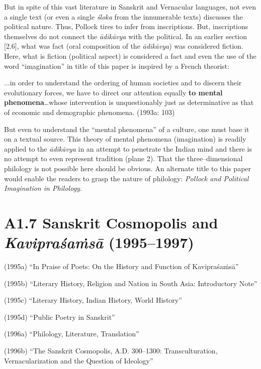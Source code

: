 {{But in spite of this vast literature in Sanskrit and Vernacular languages, not even a single text (or even a single \textit{śloka} from the innumerable texts) discusses the political nature. Thus, Pollock tires to infer from inscriptions. But, inscriptions themselves do not connect the \textit{ādikāvya} with the political. In an earlier section [2.6], what was fact (oral composition of the\textit{ ādikāvya}) was considered fiction. Here, what is fiction (political aspect) is considered a fact and even the use of the word “imagination” in title of this paper is inspired by a French theorist:

\begin{myquote}
...in order to understand the ordering of human societies and to discern their evolutionary forces, we have to direct our attention equally \textbf{to mental phenomena}…whose intervention is unquestionably just as determinative as that of economic and demographic phenomena. (1993a: 103)
\end{myquote}

But even to understand the “mental phenomena” of a culture, one must base it on a textual source. This theory of mental phenomena (imagination) is readily applied to the \textit{ādikāvya} in an attempt to penetrate the Indian mind and there is no attempt to even represent tradition (plane 2). That the three–dimensional philology is not possible here should be obvious. An alternate title to this paper would enable the readers to grasp the nature of philology: \textit{Pollock and Political Imagination in Philology}.

\vspace{-.3cm}

\section*{A1.7 Sanskrit Cosmopolis and \textit{Kavipraśaṁsā} (1995–1997)}

(1995a) “In Praise of Poets: On the History and Function of Kavipraśaṁsā”

(1995b) “Literary History, Religion and Nation in South Asia: Introductory Note”

(1995c) “Literary History, Indian History, World History”

(1995d) “Public Poetry in Sanskrit”

(1996a) “Philology, Literature, Translation”

(1996b) “The Sanskrit Cosmopolis, A.D. 300–1300: Transculturation, Vernacularization and the Question of Ideology”

}}
